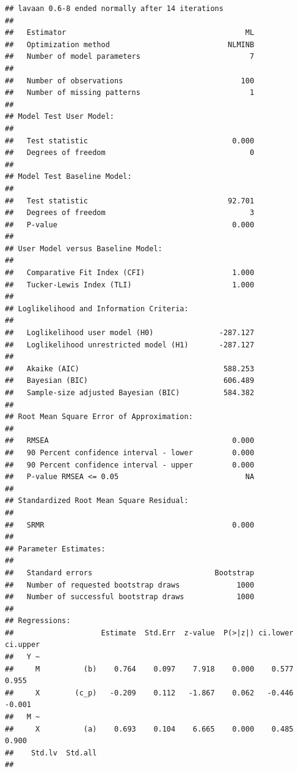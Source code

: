 \documentclass[
  english,
]{book}
\begin{document}
\begin{verbatim}
## lavaan 0.6-8 ended normally after 14 iterations
## 
##   Estimator                                         ML
##   Optimization method                           NLMINB
##   Number of model parameters                         7
##                                                       
##   Number of observations                           100
##   Number of missing patterns                         1
##                                                       
## Model Test User Model:
##                                                       
##   Test statistic                                 0.000
##   Degrees of freedom                                 0
## 
## Model Test Baseline Model:
## 
##   Test statistic                                92.701
##   Degrees of freedom                                 3
##   P-value                                        0.000
## 
## User Model versus Baseline Model:
## 
##   Comparative Fit Index (CFI)                    1.000
##   Tucker-Lewis Index (TLI)                       1.000
## 
## Loglikelihood and Information Criteria:
## 
##   Loglikelihood user model (H0)               -287.127
##   Loglikelihood unrestricted model (H1)       -287.127
##                                                       
##   Akaike (AIC)                                 588.253
##   Bayesian (BIC)                               606.489
##   Sample-size adjusted Bayesian (BIC)          584.382
## 
## Root Mean Square Error of Approximation:
## 
##   RMSEA                                          0.000
##   90 Percent confidence interval - lower         0.000
##   90 Percent confidence interval - upper         0.000
##   P-value RMSEA <= 0.05                             NA
## 
## Standardized Root Mean Square Residual:
## 
##   SRMR                                           0.000
## 
## Parameter Estimates:
## 
##   Standard errors                            Bootstrap
##   Number of requested bootstrap draws             1000
##   Number of successful bootstrap draws            1000
## 
## Regressions:
##                    Estimate  Std.Err  z-value  P(>|z|) ci.lower ci.upper
##   Y ~                                                                   
##     M          (b)    0.764    0.097    7.918    0.000    0.577    0.955
##     X        (c_p)   -0.209    0.112   -1.867    0.062   -0.446   -0.001
##   M ~                                                                   
##     X          (a)    0.693    0.104    6.665    0.000    0.485    0.900
##    Std.lv  Std.all
##                   

\end{verbatim}
\end{document}
